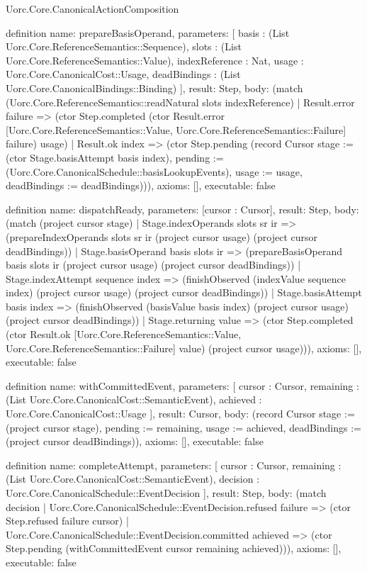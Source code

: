 \begin{lexlean}{Uorc.Core.CanonicalActionComposition}
\begin{semanticmodule}
definition{
  name: prepareBasisOperand,
  parameters: [
    basis : (List Uorc.Core.ReferenceSemantics::Sequence),
    slots : (List Uorc.Core.ReferenceSemantics::Value),
    indexReference : Nat,
    usage : Uorc.Core.CanonicalCost::Usage,
    deadBindings : (List Uorc.Core.CanonicalBindings::Binding)
  ],
  result: Step,
  body: (match (Uorc.Core.ReferenceSemantics::readNatural slots indexReference)
    | Result.error failure => (ctor Step.completed (ctor Result.error [Uorc.Core.ReferenceSemantics::Value, Uorc.Core.ReferenceSemantics::Failure] failure) usage)
    | Result.ok index => (ctor Step.pending (record Cursor {stage := (ctor Stage.basisAttempt basis index), pending := (Uorc.Core.CanonicalSchedule::basisLookupEvents), usage := usage, deadBindings := deadBindings}))),
  axioms: [],
  executable: false
}

definition{
  name: dispatchReady,
  parameters: [cursor : Cursor],
  result: Step,
  body: (match (project cursor stage)
    | Stage.indexOperands slots sr ir => (prepareIndexOperands slots sr ir (project cursor usage) (project cursor deadBindings))
    | Stage.basisOperand basis slots ir => (prepareBasisOperand basis slots ir (project cursor usage) (project cursor deadBindings))
    | Stage.indexAttempt sequence index => (finishObserved (indexValue sequence index) (project cursor usage) (project cursor deadBindings))
    | Stage.basisAttempt basis index => (finishObserved (basisValue basis index) (project cursor usage) (project cursor deadBindings))
    | Stage.returning value => (ctor Step.completed (ctor Result.ok [Uorc.Core.ReferenceSemantics::Value, Uorc.Core.ReferenceSemantics::Failure] value) (project cursor usage))),
  axioms: [],
  executable: false
}

definition{
  name: withCommittedEvent,
  parameters: [
    cursor : Cursor,
    remaining : (List Uorc.Core.CanonicalCost::SemanticEvent),
    achieved : Uorc.Core.CanonicalCost::Usage
  ],
  result: Cursor,
  body: (record Cursor {stage := (project cursor stage), pending := remaining, usage := achieved, deadBindings := (project cursor deadBindings)}),
  axioms: [],
  executable: false
}

definition{
  name: completeAttempt,
  parameters: [
    cursor : Cursor,
    remaining : (List Uorc.Core.CanonicalCost::SemanticEvent),
    decision : Uorc.Core.CanonicalSchedule::EventDecision
  ],
  result: Step,
  body: (match decision
    | Uorc.Core.CanonicalSchedule::EventDecision.refused failure => (ctor Step.refused failure cursor)
    | Uorc.Core.CanonicalSchedule::EventDecision.committed achieved => (ctor Step.pending (withCommittedEvent cursor remaining achieved))),
  axioms: [],
  executable: false
}


\end{semanticmodule}
\end{lexlean}
